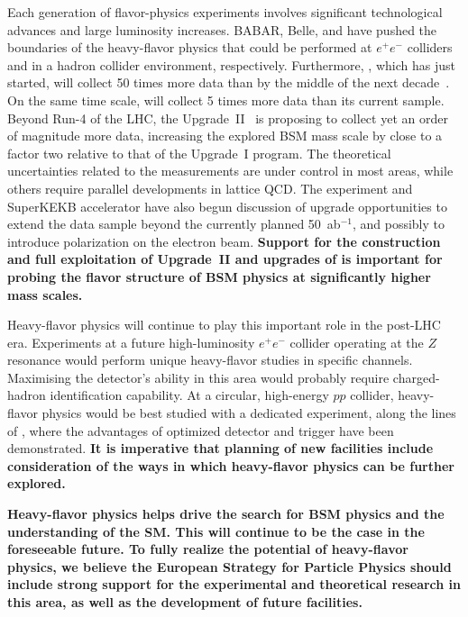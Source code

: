 \documentclass[12pt,a4paper]{article}
\begin{document}
Each generation of flavor-physics experiments involves significant technological advances and large luminosity increases. BABAR, Belle, and \lhcb have pushed the boundaries of the heavy-flavor physics that could be
performed at $e^+ e^-$ colliders and in a hadron collider environment, respectively. Furthermore, \belletwo, which has just started, will collect 50 times more data than \belle by the middle of the next decade~\cite{Kou:2018nap}. On the same time scale, \lhcb will collect 5 times more data than its current sample. Beyond Run-4 of the LHC, the \lhcb Upgrade~II~\cite{LHCb-PII-Physics} is proposing to collect yet an order of magnitude more data,
increasing the explored BSM mass scale by close to a factor two relative to that of the Upgrade~I program. The
theoretical uncertainties related to the measurements are under control in most areas, while others require parallel developments in lattice QCD. The \belletwo experiment and SuperKEKB accelerator have also begun discussion of upgrade opportunities to extend the data sample beyond the currently planned 50~ab$^{-1}$, and possibly to introduce polarization on the electron beam.
\textbf{Support for the construction and full exploitation of \lhcb Upgrade~II and upgrades of \belletwo is important for probing the flavor structure of BSM physics at significantly higher mass scales. }

Heavy-flavor physics will continue to play this important role in the post-LHC era. 
Experiments at a future high-luminosity $e^+ e^-$ collider operating at the $Z$ resonance would perform unique heavy-flavor studies in specific channels. Maximising the detector's ability in this area would probably require charged-hadron identification capability. 
At a circular, high-energy $pp$ collider, heavy-flavor physics would be best studied with a dedicated experiment, along the lines of \lhcb, where the advantages of optimized detector and trigger have been demonstrated. \textbf{It is imperative that planning of new facilities include consideration of the ways in which heavy-flavor physics can be further explored.}

\textbf{Heavy-flavor physics helps drive the search for BSM physics and the understanding of the SM. This will continue to be the case in the foreseeable future. To fully realize the potential of heavy-flavor physics, we believe the European Strategy for Particle Physics should include strong support for the experimental and theoretical research in this area, as well as the development of future facilities.}



\end{document}
